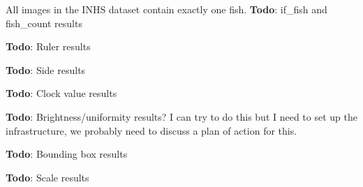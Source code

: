 \documentclass[screen,review]{acmart}
\begin{document}
All images in the INHS dataset contain exactly one fish. \textbf{Todo}: if\_fish and fish\_count results

\textbf{Todo}: Ruler results

\textbf{Todo}: Side results

\textbf{Todo}: Clock value results

\textbf{Todo}: Brightness/uniformity results? I can try to do this but I need to set up the infrastructure, we probably need to discuss a plan of action for this.

\textbf{Todo}: Bounding box results

\textbf{Todo}: Scale results

\end{document}
